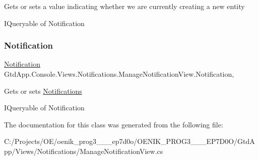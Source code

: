 Gets or sets a value indicating whether we are currently creating a new entity 

I\+Queryable of Notification\mbox{\label{class_gtd_app_1_1_console_1_1_views_1_1_notifications_1_1_manage_notification_view_acaa5af98f74844b709d93e4af7b8aaac}} 
\subsubsection{\texorpdfstring{Notification}{Notification}}
{\footnotesize\ttfamily \mbox{\hyperlink{class_gtd_app_1_1_data_1_1_notification}{Notification}} Gtd\+App.\+Console.\+Views.\+Notifications.\+Manage\+Notification\+View.\+Notification\hspace{0.3cm}{\ttfamily [get]}, {\ttfamily [set]}}



Gets or sets \mbox{\hyperlink{namespace_gtd_app_1_1_console_1_1_views_1_1_notifications}{Notifications}} 

I\+Queryable of Notification

The documentation for this class was generated from the following file\+:\begin{DoxyCompactItemize}
\item 
C\+:/\+Projects/\+O\+E/oenik\+\_\+prog3\+\_\+\_\+\_\+ep7d0o/\+O\+E\+N\+I\+K\+\_\+\+P\+R\+O\+G3\+\_\+\_\+\_\+\+E\+P7\+D0\+O/\+Gtd\+App/\+Views/\+Notifications/Manage\+Notification\+View.\+cs\end{DoxyCompactItemize}
